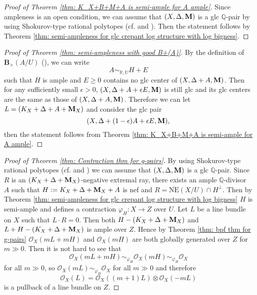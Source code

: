\documentclass[11pt]{amsart}
\numberwithin{equation}{section}
\newcommand{\Mm}{{\bf{M}}}
\newcommand{\Qq}{\mathbb{Q}}
\newcommand{\Rr}{\mathbb{R}}
\newcommand{\Oo}{\mathcal{O}}
\newcommand{\NE}{\mathrm{NE}}
\newtheorem{cor}[thm]{Corollary}
\theoremstyle{definition}
\theoremstyle{definition}
\theoremstyle{definition}
\begin{document}
\begin{proof}[Proof of Theorem \ref{thm: K_X+B+M+A is semi-ample for A ample}]
Since ampleness is an open condition, we can assume that $(X,\Delta,\Mm)$ is a glc $\Qq$-pair by using Shokurov-type rational polytopes (cf. \cite[Proposition 3.16]{HL22} and \cite[Lemma 5.3]{HLS19}). Then the statement follows by Theorem \ref{thm: semi-ampleness for glc crepant log structure with log bigness}.
\end{proof}

\begin{proof}[Proof of Theorem \ref{thm: semi-ampleness with good B+(A)}]
By the definition of $\mathbf{B}_+(A/U)$ (\cite[Definition 3.5.1]{BCHM10}), we can write 
$$
A\sim_{\Rr,U}H+E
$$
such that $H$ is ample and $E\ge0$ contains no glc center of $(X,\Delta+A,\Mm)$. Then for any sufficiently small $\epsilon>0$, $(X,\Delta+A+\epsilon E,\Mm)$ is still glc and its glc centers are the same as those of $(X,\Delta+A,\Mm)$. Therefore we can let $L=(K_X+\Delta+A+\Mm_X)$ and consider the glc pair 
$$
(X,\Delta+(1-\epsilon)A+\epsilon E,\Mm),
$$
then the statement follows from Theorem \ref{thm: K_X+B+M+A is semi-ample for A ample}.
\end{proof}


\begin{proof}[Proof of Theorem \ref{thm: Contraction thm for g-pairs}]
By using Shokurov-type rational polytopes (cf. \cite[Proposition 3.16]{HL22} and \cite[Lemma 5.3]{HLS19}) we can assume that $(X,\Delta,\Mm)$ is a glc $\Qq$-pair. Since $R$ is an $(K_X+\Delta+\Mm_X)$-negative extremal ray, there exists an ample $\Qq$-divisor $A$ such that $H:=K_X+\Delta+\Mm_X+A$ is nef and $R=\overline{\NE}(X/U)\cap H^\perp$. Then by Theorem \ref{thm: semi-ampleness for glc crepant log structure with log bigness} $H$ is semi-ample and defines a contraction $\varphi_H:X\to Z$ over $U$. Let $L$ be a line bundle on $X$ such that $L\cdot R=0$. Then both $H-(K_X+\Delta+\Mm_X)$ and $L+H-(K_X+\Delta+\Mm_X)$ is ample over $Z$. Hence by Theorem \ref{thm: bpf thm for g-pairs} $\Oo_X(mL+mH)$ and $\Oo_X(mH)$ are both globally generated over $Z$ for $m\gg0$. Then it is not hard to see that 
$$
\Oo_X(mL+mH)\sim_{\varphi_H}\Oo_X(mH)\sim_{\varphi_H}\Oo_X
$$ 
for all $m\gg0$, so $\Oo_X(mL)\sim_{\varphi_H}\Oo_X$ for all $m\gg0$ and therefore 
$$
\Oo_X(L)=\Oo_X((m+1)L)\otimes\Oo_X(-mL)
$$ is a pullback of a line bundle on $Z$.
\end{proof}
\end{document}
